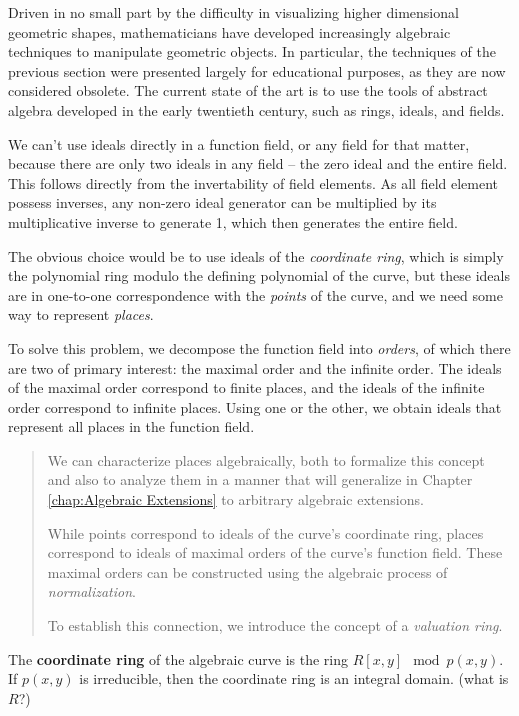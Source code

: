 \vfill\eject
{}

Driven in no small part by the difficulty in visualizing higher dimensional geometric shapes,
mathematicians have developed increasingly algebraic techniques to manipulate geometric objects.
In particular, the techniques of the previous section were presented largely for educational purposes,
as they are now considered obsolete.
The current state of the art is to use the tools of abstract algebra developed in the early
twentieth century, such as rings, ideals, and fields.

We can't use ideals directly in a function field, or any field for that matter, because
there are only two ideals in any field -- the zero ideal and the entire field.  This
follows directly from the invertability of field elements.  As all field element possess
inverses, any non-zero ideal generator can be multiplied by its multiplicative inverse
to generate 1, which then generates the entire field.

The obvious choice would be to use ideals of the {\it coordinate ring}, which is simply
the polynomial ring modulo the defining polynomial of the curve, but these ideals
are in one-to-one correspondence with the {\it points} of the curve, and we need
some way to represent {\it places}.

To solve this problem, we decompose the function field into {\it orders}, of which
there are two of primary interest: the maximal order and the infinite order.
The ideals of the maximal order correspond to
finite places, and the ideals of the infinite order correspond to infinite places.
Using one or the other, we obtain ideals that represent all places in the function field.

\begin{quotation}
We can characterize places algebraically, both to formalize this
concept and also to analyze them in a manner that will generalize
in Chapter \ref{chap:Algebraic Extensions} to arbitrary algebraic extensions.

While points correspond to ideals of the curve's coordinate ring,
places correspond to ideals of maximal orders of the curve's
function field.  These maximal orders can be constructed
using the algebraic process of {\it normalization}.

To establish this connection, we introduce the concept of a
{\it valuation ring}.
\end{quotation}

\begin{definition}
The {\bf coordinate ring} of the algebraic curve is the ring $R[x,y] \mod p(x,y)$.
If $p(x,y)$ is irreducible, then the coordinate
ring is an integral domain.  (what is $R$?)
\end{definition}

